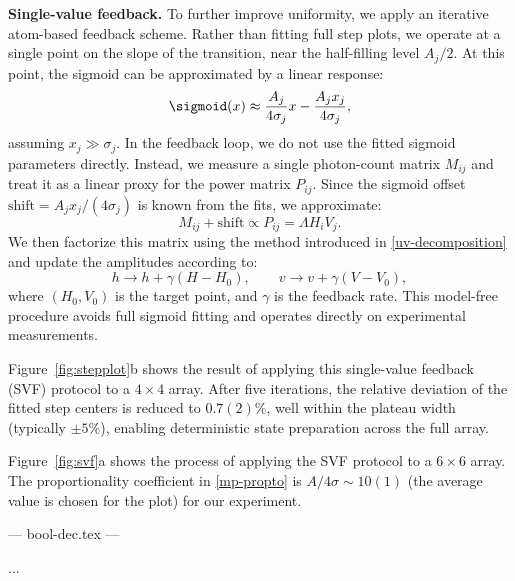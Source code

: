 \textbf{Single-value feedback.}
To further improve uniformity, we apply an iterative atom-based feedback scheme. Rather than fitting full step plots, we operate at a single point on the slope of the transition, near the half-filling level $A_j / 2$. At this point, the sigmoid can be approximated by a linear response:
\begin{equation*}
    \sigmoid(x) \approx \frac{A_j}{4 \sigma_j} x - \frac{A_j x_j}{4 \sigma_j},
\end{equation*}
assuming $x_j \gg \sigma_j$.  In the feedback loop, we do not use the fitted sigmoid parameters directly. Instead, we measure a single photon-count matrix $M_{ij}$ and treat it as a linear proxy for the power matrix $P_{ij}$. Since the sigmoid offset $\mathrm{shift} = A_j x_j / (4 \sigma_j)$ is known from the fits, we approximate:
\begin{equation}
    \label{mp-propto}
    M_{ij} + \mathrm{shift} \propto P_{ij} = \Lambda H_i V_j.
\end{equation}
We then factorize this matrix using the method introduced in \eqref{uv-decomposition} and update the amplitudes according to:
\begin{equation*}
    h \rightarrow h + \gamma (H - H_0), \qquad
    v \rightarrow v + \gamma (V - V_0),
\end{equation*}
where $(H_0, V_0)$ is the target point, and $\gamma$ is the feedback rate. This model-free procedure avoids full sigmoid fitting and operates directly on experimental measurements.

Figure~\ref{fig:stepplot}b shows the result of applying this single-value feedback (SVF) protocol to a $4 \times 4$ array. After five iterations, the relative deviation of the fitted step centers is reduced to $0.7(2)\%$, well within the plateau width (typically $\pm5\%$), enabling deterministic state preparation across the full array. 

Figure~\ref{fig:svf}a shows the process of applying the SVF protocol to a $6 \times 6$ array. The proportionality coefficient in \eqref{mp-propto} is $A/4\sigma \sim 10(1)$ (the average value is chosen for the plot) for our experiment.

--- bool-dec.tex ---

...


